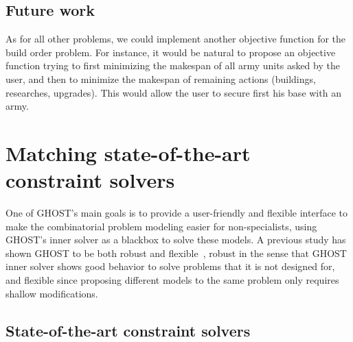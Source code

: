 \documentclass[journal]{IEEEtran}
\newcommand{\ghost}{\textsc{GHOST}\xspace}
\begin{document}
\subsection{Future work}

As  for  all other  problems,  we  could implement  another  objective
function  for the  build  order  problem. For  instance,  it would  be
natural to  propose an objective  function trying to  first minimizing
the makespan of all army units asked by the user, and then to minimize
the   makespan   of    remaining   actions   (buildings,   researches,
upgrades). This would allow the user  to secure first his base with an
army.



\section{Matching state-of-the-art constraint solvers}\label{sec:SOTA}

One  of \ghost's  main goals  is  to provide  a user-friendly and  flexible
interface   to  make  the  combinatorial   problem  modeling  easier for
non-specialists, using \ghost's inner solver as a blackbox to solve
these models. A previous study has  shown \ghost to be both robust and
flexible~\cite{aiide15_rts},  robust in  the sense  that \ghost  inner
solver shows good  behavior to solve problems that it is  not designed for,
and flexible since proposing different models to the same problem only
requires shallow modifications.

\subsection{State-of-the-art constraint solvers}
\end{document}
